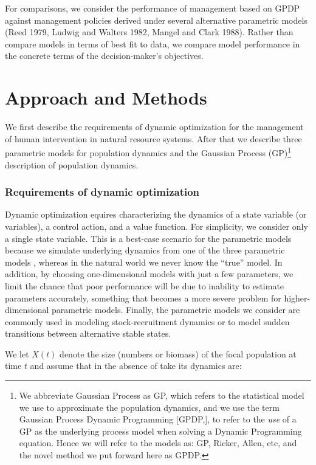 \documentclass[author-year, 12pt,review]{components/elsarticle} %
\begin{document}
For comparisons, we consider the performance of management based on GPDP
against management policies derived under several alternative parametric
models (Reed 1979, Ludwig and Walters 1982, Mangel and Clark 1988).
Rather than compare models in terms of best fit to data, we compare
model performance in the concrete terms of the decision-maker's
objectives.

\section{Approach and Methods}\label{approach-and-methods}

We first describe the requirements of dynamic optimization for the
management of human intervention in natural resource systems. After that
we describe three parametric models for population dynamics and the
Gaussian Process (GP)\footnote{We abbreviate Gaussian Process as GP,
  which refers to the statistical model we use to approximate the
  population dynamics, and we use the term Gaussian Process Dynamic
  Programming {[}GPDP,{]}, to refer to the \emph{use} of a GP as the
  underlying process model when solving a Dynamic Programming equation.
  Hence we will refer to the models as: GP, Ricker, Allen, etc, and the
  novel method we put forward here as GPDP.} description of population
dynamics.

\subsubsection{Requirements of dynamic
optimization}\label{requirements-of-dynamic-optimization}

Dynamic optimization equires characterizing the dynamics of a state
variable (or variables), a control action, and a value function. For
simplicity, we consider only a single state variable. This is a
best-case scenario for the parametric models because we simulate
underlying dynamics from one of the three parametric models , whereas in
the natural world we never know the ``true'' model. In addition, by
choosing one-dimensional models with just a few parameters, we limit the
chance that poor performance will be due to inability to estimate
parameters accurately, something that becomes a more severe problem for
higher-dimensional parametric models. Finally, the parametric models we
consider are commonly used in modeling stock-recruitment dynamics or to
model sudden transitions between alternative stable states.

We let \(X(t)\) denote the size (numbers or biomass) of the focal
population at time \(t\) and assume that in the absence of take its
dynamics are:
\end{document}

